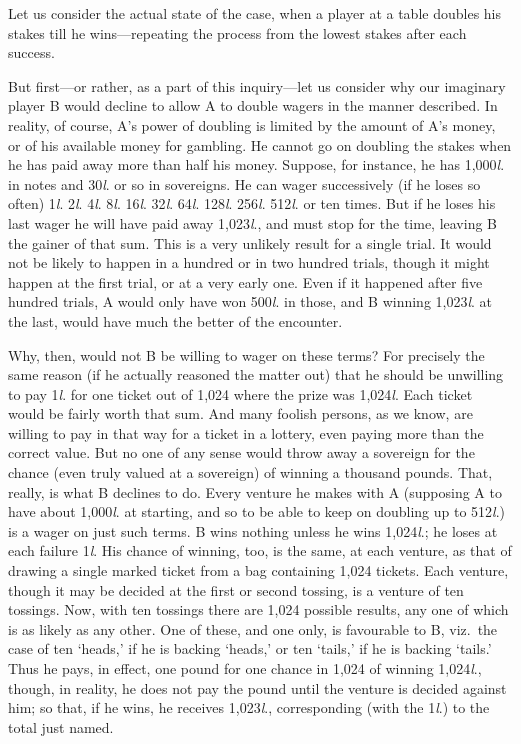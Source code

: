 \documentclass[letterpaper,12pt,oneside,openany]{memoir}
\begin{document}
Let us consider the actual state of the case, when a
player at a table doubles his stakes till he wins---repeating
the process from the lowest stakes after each
success.

But first---or rather, as a part of this inquiry---let
us consider why our imaginary player B would decline
to allow A to double wagers in the manner described.
In reality, of course, A's power of doubling is limited
by the amount of A's money, or of his available money
for gambling. He cannot go on doubling the stakes
when he has paid away more than half his money.
Suppose, for instance, he has 1,000\textit{l}. in notes and 30\textit{l}.
or so in sovereigns. He can wager successively (if he
loses so often) 1\textit{l}. 2\textit{l}. 4\textit{l}. 8\textit{l}.
16\textit{l}. 32\textit{l}. 64\textit{l}. 128\textit{l}.
256\textit{l}. 512\textit{l}. or ten times. But if he loses his last
wager he will have paid away 1,023\textit{l}., and must stop for
the time, leaving B the gainer of that sum. This is a
very unlikely result for a single trial. It would not be
likely to happen in a hundred or in two hundred trials,
though it might happen at the first trial, or at a very
early one. Even if it happened after five hundred
trials, A would only have won 500\textit{l}. in those, and B
winning 1,023\textit{l}. at the last, would have much the better
of the encounter.

Why, then, would not B be willing to wager on
these terms? For precisely the same reason (if he
actually reasoned the matter out) that he should be
unwilling to pay 1\textit{l}. for one ticket out of 1,024 where
the prize was 1,024\textit{l}. Each ticket would be fairly worth
that sum. And many foolish persons, as we know, are
willing to pay in that way for a ticket in a lottery, even
paying more than the correct value. But no one of any
sense would throw away a sovereign for the chance (even
truly valued at a sovereign) of winning a thousand
pounds. That, really, is what B declines to do. Every
venture he makes with A (supposing A to have about
1,000\textit{l}. at starting, and so to be able to keep on doubling
up to 512\textit{l}.) is a wager on just such terms. B wins
nothing unless he wins 1,024\textit{l}.; he loses at each
failure 1\textit{l}. His chance of winning, too, is the same, at
each venture, as that of drawing a single marked ticket
from a bag containing 1,024 tickets. Each venture,
though it may be decided at the first or second tossing,
is a venture of ten tossings. Now, with ten tossings
there are 1,024 possible results, any one of which is as
likely as any other. One of these, and one only, is
favourable to B, viz.\ the case of ten `heads,' if he is
backing `heads,' or ten `tails,' if he is backing `tails.'
Thus he pays, in effect, one pound for one chance
in 1,024 of winning 1,024\textit{l}., though, in reality, he does
not pay the pound until the venture is decided against
him; so that, if he wins, he receives 1,023\textit{l}., corresponding
(with the 1\textit{l}.) to the total just named.
\end{document}
